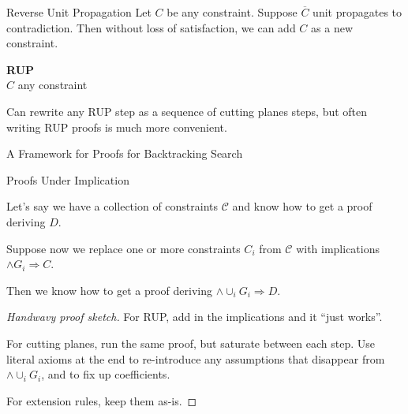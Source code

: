\documentclass[aspectratio=169,compress,10pt]{beamer}
\begin{document}
\begin{frame}{Reverse Unit Propagation}
    Let $C$ be any constraint. Suppose $\overline{C}$ unit propagates to contradiction. Then without
    loss of satisfaction, we can add $C$ as a new constraint.

    \bigskip

    \begin{minipage}[c]{0.35\framewidth}
        \textcolor{uofgcobalt}{\textbf{RUP}}\\
        $C$ any constraint
    \end{minipage}\hfill\begin{minipage}[c]{0.60\framewidth}\begin{prooftree}
    \end{prooftree}\end{minipage}

    \bigskip

    Can rewrite any RUP step as a sequence of cutting planes steps, but often writing RUP proofs is
    much more convenient.
\end{frame}

\begin{frame}{A Framework for Proofs for Backtracking Search}
\end{frame}

\begin{frame}{Proofs Under Implication}
    \begin{theorem}
    Let's say we have a collection of constraints $\mathcal{C}$ and know how to get a proof deriving
        $D$. \\\medskip

    Suppose now we replace one or more constraints $C_i$ from $\mathcal{C}$ with implications $\land
        G_i \Rightarrow C$. \\\medskip

    Then we know how to get a proof deriving $\land \cup_i G_i \Rightarrow D$.
    \end{theorem}
    \begin{proof}[Handwavy proof sketch]
        For RUP, add in the implications and it ``just works''. \\\medskip

        For cutting planes, run the same proof, but saturate between each step. Use literal
        axioms at the end to re-introduce any assumptions that disappear from $\land \cup_i G_i$,
        and to fix up coefficients. \\\medskip

        For extension rules, keep them as-is.
    \end{proof}
\end{frame}
\end{document}
